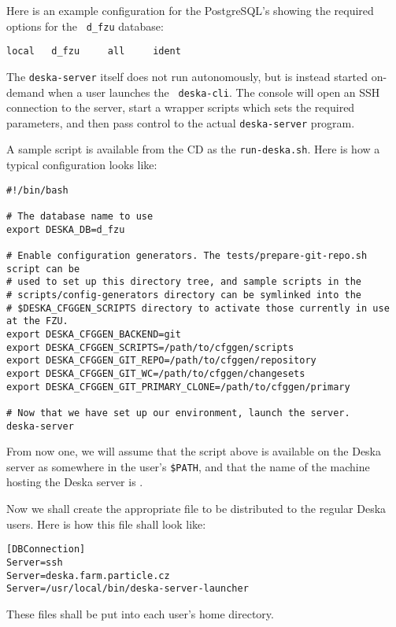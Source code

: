 \documentclass[deska]{subfiles}
\begin{document}
Here is an example configuration for the PostgreSQL's  showing the required options for the {\tt
d\_fzu} database:

\begin{verbatim}
local   d_fzu     all     ident
\end{verbatim}

The {\tt deska-server} itself does not run autonomously, but is instead started on-demand when a user launches the {\tt
deska-cli}.  The console will open an SSH connection to the server, start a wrapper scripts which sets the required
parameters, and then pass control to the actual {\tt deska-server} program.

A sample script is available from the CD as the {\tt run-deska.sh}.  Here is how a typical configuration looks like:

\label{sec:deska-server-wrapper}
\begin{verbatim}
#!/bin/bash

# The database name to use
export DESKA_DB=d_fzu

# Enable configuration generators. The tests/prepare-git-repo.sh script can be
# used to set up this directory tree, and sample scripts in the
# scripts/config-generators directory can be symlinked into the
# $DESKA_CFGGEN_SCRIPTS directory to activate those currently in use at the FZU.
export DESKA_CFGGEN_BACKEND=git
export DESKA_CFGGEN_SCRIPTS=/path/to/cfggen/scripts
export DESKA_CFGGEN_GIT_REPO=/path/to/cfggen/repository
export DESKA_CFGGEN_GIT_WC=/path/to/cfggen/changesets
export DESKA_CFGGEN_GIT_PRIMARY_CLONE=/path/to/cfggen/primary

# Now that we have set up our environment, launch the server.
deska-server
\end{verbatim}

From now one, we will assume that the script above is available on the Deska server as 
somewhere in the user's {\tt \$PATH}, and that the name of the machine hosting the Deska server is
.

Now we shall create the appropriate  file to be distributed to the regular Deska users.  Here is how
this file shall look like:

\begin{verbatim}
[DBConnection]
Server=ssh
Server=deska.farm.particle.cz
Server=/usr/local/bin/deska-server-launcher
\end{verbatim}

These files shall be put into each user's home directory.
\end{document}
